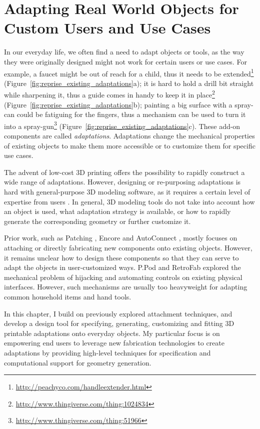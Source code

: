 \chapter{Adapting Real World Objects for Custom Users and Use Cases}

In our everyday life, we often find a need to adapt objects or tools, as the way they were originally designed might not work for certain users or use cases. For example, a faucet might be out of reach for a child, thus it needs to be extended\footnote{\url{http://peachyco.com/handleextender.html}} (Figure~\ref{fig:reprise_existing_adaptations}a); it is hard to hold a drill bit straight while sharpening it, thus a guide comes in handy to keep it in place\footnote{\url{http://www.thingiverse.com/thing:1024834}} (Figure~\ref{fig:reprise_existing_adaptations}b); painting a big surface with a spray-can could be fatiguing for the fingers, thus a mechanism can be used to turn it into a spray-gun\footnote{\url{http://www.thingiverse.com/thing:51966}} (Figure~\ref{fig:reprise_existing_adaptations}c). These add-on components are called \textit{adaptations}. Adaptations change the mechanical properties of existing objects to make them more accessible or to customize them for specific use cases.

The advent of low-cost 3D printing offers the possibility to rapidly construct a wide range of adaptations. However, designing or re-purposing adaptations is hard with general-purpose 3D modeling software, as it requires a certain level of expertise from users \cite{hurst2013making}. In general, 3D modeling tools do not take into account how an object is used, what adaptation strategy is available, or how to rapidly generate the corresponding geometry or further customize it.

Prior work, such as Patching \cite{teibrich2015patching}, Encore \cite{chen2015encore} and AutoConnect \cite{koyama2015autoconnect}, mostly focuses on attaching or directly fabricating new components onto existing objects. However, it remains unclear how to design these components so that they can serve to adapt the objects in user-customized ways. P.Pod \cite{davidoff2011mechanical} and RetroFab \cite{ramaker2015retrofab} explored the mechanical problem of hijacking and automating controls on existing physical interfaces. However, such mechanisms are usually too heavyweight for adapting common household items and hand tools. 

In this chapter, I build on previously explored attachment techniques, and develop a design tool for specifying, generating, customizing and fitting 3D printable adaptations onto everyday objects. My particular focus is on empowering end users to leverage new fabrication technologies to create adaptations by providing high-level techniques for specification and computational support for geometry generation.

